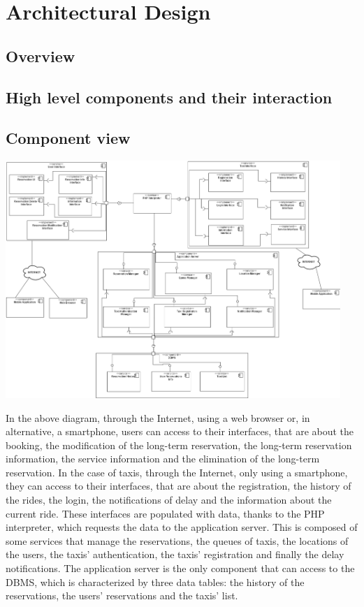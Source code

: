 \section{Architectural Design}
\subsection{Overview}
\subsection{High level components and their interaction}
\subsection{Component view}
	\begin{center}
		\includegraphics[width=0.95\textwidth]{./images/component_view.png}
	\end{center}
	
	In the above diagram, through the Internet, using a web browser or, in alternative, a smartphone, users can access to their interfaces, that are about the booking, the modification of the long-term reservation, the long-term reservation information, the service information and the elimination of the long-term reservation. 
	In the case of taxis, through the Internet, only using a smartphone, they can access to their interfaces, that are about the registration, the history of the rides, the login, the notifications of delay and the information about the current ride.
	These interfaces are populated with data, thanks to the PHP interpreter, which requests the data to the application server. This is composed of some services that manage the reservations, the queues of taxis, the locations of the users, the taxis' authentication, the taxis' registration and finally the delay notifications.
	The application server is the only component that can access to the DBMS, which is characterized by three data tables: the history of the reservations, the users' reservations and the taxis' list.
